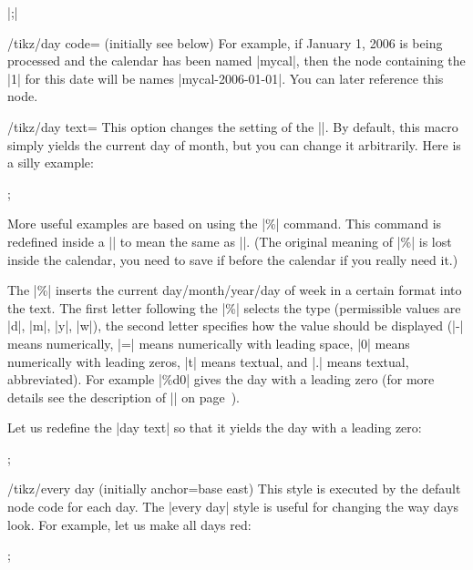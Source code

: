 \begin{command}{\calendar {}|;|}
\begin{key}{/tikz/day code= (initially \normalfont see below)}
    For example, if January 1, 2006 is being processed and the
    calendar has been named |mycal|, then the node containing the |1|
    for this date will be names |mycal-2006-01-01|. You can later
    reference this node.
\begin{codeexample}[]
\end{codeexample}
  \end{key}

  \begin{key}{/tikz/day text=}
    This option changes the setting of the |\tikzdaytext|. By default,
    this macro simply yields the current day of month, but you can
    change it arbitrarily. Here is a silly example:
\begin{codeexample}[]
\tikz \calendar[dates=2000-01-01 to 2000-01-31,week list,
                day text=x];
\end{codeexample}
    More useful examples are based on using the |\%| command. This
    command is redefined inside a |\pgfcalendar| to mean the same as
    |\pgfcalendarshorthand|. (The original meaning of |\%| is lost
    inside the calendar, you need to save if before the calendar if
    you really need it.)

    The |\%| inserts the current day/month/year/day of week in a
    certain format into the text. The first letter following the |\%|
    selects the type (permissible values are |d|, |m|, |y|, |w|), the
    second letter specifies how the value should be displayed (|-|
    means numerically, |=| means numerically with leading
    space, |0| means numerically with leading zeros, |t| means
    textual, and |.| means textual, abbreviated). For example |\%d0|
    gives the day with a leading zero (for more details see
    the description of |\pgfcalendarshorthand| on
    page~\pageref{pgfcalendarshorthand}).

    Let us redefine the |day text| so that it yields the day with a
    leading zero:
\begin{codeexample}
\tikz \calendar[dates=2000-01-01 to 2000-01-31,week list,
                day text=\%d0];
\end{codeexample}
  \end{key}

  \begin{stylekey}{/tikz/every day (initially anchor=base east)}
    This style is executed by the default node code for each day.
    The |every day| style is useful for changing the way days
    look. For example, let us make all days red:
\begin{codeexample}
\tikz[every day/.style=red]
  \calendar[dates=2000-01-01 to 2000-01-31,week list];
\end{codeexample}
  \end{stylekey}



\end{command}
